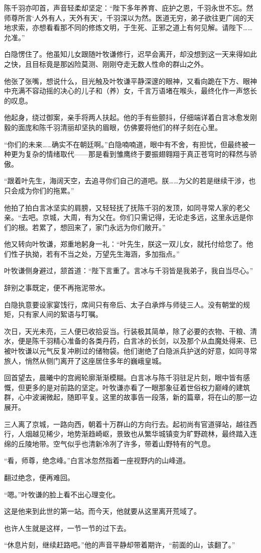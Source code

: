 陈千羽亦叩首，声音轻柔却坚定：“陛下多年养育、庇护之恩，千羽永世不忘。然师尊所言‘人外有人，天外有天’，千羽深以为然。医道无穷，弟子欲往更广阔的天地求索，亦想看看那不同的修炼文明，于生死、正邪之道上有何见解。请陛下……允准。”

白隐愣住了。他虽知儿女跟随叶牧谦修行，迟早会离开，却没想到这一天来得如此之快，且目标竟是那凶险莫测、刚刚夺走无数人性命的群山之外。

他张了张嘴，想说什么，目光触及叶牧谦平静深邃的眼神，又看向跪在下方、眼神中充满不容动摇的决心的儿子和（养）女，千言万语堵在喉头，最终化作一声悠长的叹息。

他起身，绕过御案，亲手将两人扶起。他的手有些颤抖，仔细端详着白言冰愈发刚毅的面庞和陈千羽清丽却坚执的眉眼，仿佛要将他们的样子刻在心里。

“你们的未来……确实不在朝廷啊。”白隐喃喃道，眼中有不舍，有担忧，但最终被一种更为复杂的情绪取代——那是看到雏鹰终于要振翅翱翔于真正苍穹时的释然与骄傲。

“跟着叶先生，海阔天空，去追寻你们自己的道吧。朕……为父的若是继续干涉，也只会成为你们的拖累。”

他拍了拍白言冰坚实的肩膀，又轻轻抚了抚陈千羽的发顶，如同寻常人家的老父亲。“去吧。京城，大周，有为父在。你们只需记得，无论走多远，这里永远是你们的根。若累了，想回来了，家门永远为你们敞开。”

他又转向叶牧谦，郑重地躬身一礼：“叶先生，朕这一双儿女，就托付给您了。他们性子执拗，若有不当之处，万望先生海涵，多加指点。”

叶牧谦侧身避过，颔首道：“陛下言重了。言冰与千羽皆是我弟子，我自当尽心。”

辞别之事既定，便不再拖泥带水。

白隐执意要设家宴饯行，席间只有帝后、太子白承烨与师徒三人。没有朝堂的规矩，只有家人间的絮语与叮嘱。

次日，天光未亮，三人便已收拾妥当。行装极其简单，除了必要的衣物、干粮、清水，便是陈千羽精心准备的各类丹药，白言冰的长剑，以及那个从血魔处得来、已被叶牧谦以元气反复冲刷过的储物袋。他们谢绝了白隐派兵护送的好意，如同寻常旅人，悄然从侧门离开了这座居住多年的巍峨皇城。

回首望去，晨曦中的宫阙轮廓渐渐模糊。白言冰与陈千羽驻足片刻，眼中皆有感慨，但更多的是对前路的坚定。叶牧谦亦看了一眼那象征着世俗权力巅峰的建筑群，心中波澜微起，随即平复。这里的故事告一段落，新的篇章，将在山的那一边展开。

三人离了京城，一路向西，朝着十万群山的方向行去。起初尚有官道驿站，越往西行，人烟越见稀少，地势渐趋崎岖，景致也从繁华城镇变为旷野疏林，最终踏入连绵的丘陵地带。空气似乎也清新冷冽了许多，带着山野特有的气息。

“看，师尊，绝念峰。”白言冰忽然指着一座视野内的山峰道。

翻过绝念，便再难回。

“嗯。”叶牧谦的脸上看不出心理变化。

这是他来到此世的第一站。而今天，他就要从这里离开荒域了。

也许人生就是这样，一节一节的过下去。

“休息片刻，继续赶路吧。”他的声音平静却带着期许，“前面的山，该翻了。”